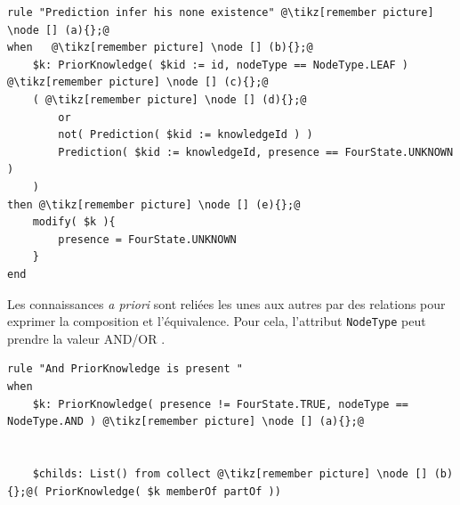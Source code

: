 \begin{refsegment}
\begin{lstlisting}[caption=Inférence de la prédiction d'absence, style=drl-style]
rule "Prediction infer his none existence" @\tikz[remember picture] \node [] (a){};@
when   @\tikz[remember picture] \node [] (b){};@
	$k: PriorKnowledge( $kid := id, nodeType == NodeType.LEAF )   @\tikz[remember picture] \node [] (c){};@
	( @\tikz[remember picture] \node [] (d){};@
		or
		not( Prediction( $kid := knowledgeId ) )
		Prediction( $kid := knowledgeId, presence == FourState.UNKNOWN )
	)
then @\tikz[remember picture] \node [] (e){};@
	modify( $k ){ 
		presence = FourState.UNKNOWN
	}
end
\end{lstlisting}

Les connaissances \textit{a priori} sont reliées les unes aux autres par des relations pour exprimer la composition et l'équivalence. Pour cela, l'attribut \texttt{NodeType} peut prendre la valeur AND/OR .

\begin{lstlisting}[caption=Inférence de la prédiction de présence à travers les connaissances, style=drl-style]
rule "And PriorKnowledge is present "
when
	$k: PriorKnowledge( presence != FourState.TRUE, nodeType == NodeType.AND ) @\tikz[remember picture] \node [] (a){};@
	
    
	$childs: List() from collect @\tikz[remember picture] \node [] (b){};@( PriorKnowledge( $k memberOf partOf )) 
	

\end{lstlisting}
\end{refsegment}
